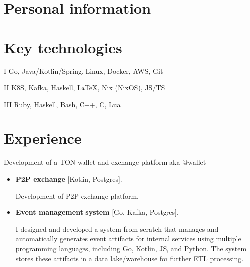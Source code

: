 \documentclass{cv}
\begin{document}
\iftrue

	\section{Personal information}




\fi


\section{Key technologies}

\begin{cvblock}{I}
	Go, Java/Kotlin/Spring, Linux, Docker, AWS, Git
\end{cvblock}

\begin{cvblock}{II}
	K8S, Kafka, Haskell, \LaTeX, Nix (NixOS), JS/TS
\end{cvblock}

\begin{cvblock}{III}
	Ruby, Haskell, Bash, C++, C, Lua
\end{cvblock}


\section{Experience}

\begin{cvblock}{%
		}

	Development of a TON wallet and exchange platform aka @wallet

	\begin{itemize}
		\item \textbf{P2P exchange} [Kotlin, Postgres].

					Development of P2P exchange platform.

		\item \textbf{Event management system} [Go, Kafka, Postgres].

					I designed and developed a system from scratch that manages and automatically
					generates event artifacts for internal services using multiple programming
					languages, including Go, Kotlin, JS, and Python.
					The system stores these artifacts in a data lake/warehouse for further ETL processing.

	\end{itemize}
\end{cvblock}
\end{document}
